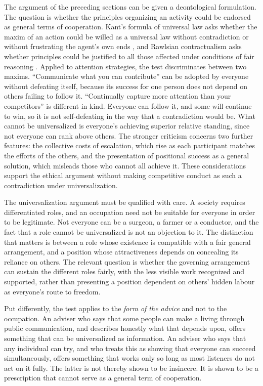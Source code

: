 \documentclass[11pt]{article}
\theoremstyle{definition}
\theoremstyle{remark}
\begin{document}
The argument of the preceding sections can be given a deontological formulation. The question is whether the principles organizing an activity could be endorsed as general terms of cooperation. Kant's formula of universal law asks whether the maxim of an action could be willed as a universal law without contradiction or without frustrating the agent's own ends \cite{kant1785}, and Rawlsian contractualism asks whether principles could be justified to all those affected under conditions of fair reasoning \cite{rawls1971}. Applied to attention strategies, the test discriminates between two maxims. ``Communicate what you can contribute'' can be adopted by everyone without defeating itself, because its success for one person does not depend on others failing to follow it. ``Continually capture more attention than your competitors'' is different in kind. Everyone can follow it, and some will continue to win, so it is not self-defeating in the way that a contradiction would be. What cannot be universalized is everyone's achieving superior relative standing, since not everyone can rank above others. The stronger criticism concerns two further features: the collective costs of escalation, which rise as each participant matches the efforts of the others, and the presentation of positional success as a general solution, which misleads those who cannot all achieve it. These considerations support the ethical argument without making competitive conduct as such a contradiction under universalization.

The universalization argument must be qualified with care. A society requires differentiated roles, and an occupation need not be suitable for everyone in order to be legitimate. Not everyone can be a surgeon, a farmer or a conductor, and the fact that a role cannot be universalized is not an objection to it. The distinction that matters is between a role whose existence is compatible with a fair general arrangement, and a position whose attractiveness depends on concealing its reliance on others. The relevant question is whether the governing arrangement can sustain the different roles fairly, with the less visible work recognized and supported, rather than presenting a position dependent on others' hidden labour as everyone's route to freedom.

Put differently, the test applies to the \emph{form of the advice} and not to the occupation. An adviser who says that some people can make a living through public communication, and describes honestly what that depends upon, offers something that can be universalized as information. An adviser who says that any individual can try, and who treats this as showing that everyone can succeed simultaneously, offers something that works only so long as most listeners do not act on it fully. The latter is not thereby shown to be insincere. It is shown to be a prescription that cannot serve as a general term of cooperation.
\end{document}
